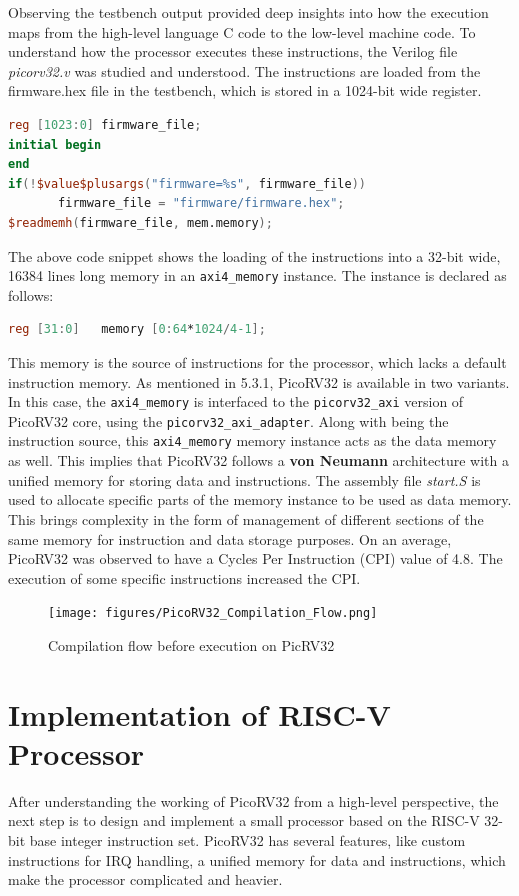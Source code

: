 Observing the testbench output provided deep insights into how the execution maps from the high-level language C code to the low-level machine code. To understand how the processor executes these instructions, the Verilog file \textit{picorv32.v} was studied and understood. The instructions are loaded from the firmware.hex file in the testbench, which is stored in a 1024-bit wide register.
\begin{lstlisting}[language=Verilog]
reg [1023:0] firmware_file;
initial begin
end
if(!$value$plusargs("firmware=%s", firmware_file))
       firmware_file = "firmware/firmware.hex";
$readmemh(firmware_file, mem.memory);
\end{lstlisting}
The above code snippet shows the loading of the instructions into a 32-bit wide, 16384 lines long memory in an \verb|axi4_memory| instance. The instance is declared as follows:\newline
\begin{lstlisting}[language=Verilog]
reg [31:0]   memory [0:64*1024/4-1];
\end{lstlisting}
This memory is the source of instructions for the processor, which lacks a default instruction memory. As mentioned in 5.3.1, PicoRV32 is available in two variants. In this case, the \verb|axi4_memory| is interfaced to the \verb|picorv32_axi| version of PicoRV32 core, using the \verb|picorv32_axi_adapter|. \newline\newline
Along with being the instruction source, this \verb|axi4_memory| memory instance acts as the data memory as well. This implies that PicoRV32 follows a \textbf{von Neumann} architecture with a unified memory for storing data and instructions. The assembly file \textit{start.S} is used to allocate specific parts of the memory instance to be used as data memory. This brings complexity in the form of management of different sections of the same memory for instruction and data storage purposes.\newline\newline
On an average, PicoRV32 was observed to have a Cycles Per Instruction (CPI) value of 4.8. The execution of some specific instructions increased the CPI. 
\begin{figure}[h!]
\centering
\texttt{[image: figures/PicoRV32\_Compilation\_Flow.png]}
\caption{Compilation flow before execution on PicRV32}
\label{fig:riscv5}
\end{figure}
 \section{Implementation of RISC-V Processor}
 \label{sect6_4}
After understanding the working of PicoRV32 from a high-level perspective, the next step is to design and implement a small processor based on the RISC-V 32-bit base integer instruction set. PicoRV32 has several features, like custom instructions for IRQ handling, a unified memory for data and instructions, which make the processor complicated and heavier.

